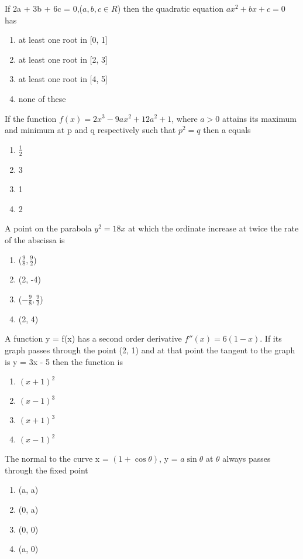\item If 2a + 3b + 6c = 0,($a, b, c \in R$) then the quadratic equation $ax^2 + bx + c = 0$ has 
\begin{enumerate}
\item at least one root in [0, 1]
\item at least one root in [2, 3]
\item at least one root in [4, 5]
\item none of these
\end{enumerate}

\item If the function $f(x) = 2x^3 - 9ax^2 + 12a^2 + 1$, where $a > 0$ attains its maximum and  minimum at p and q respectively such that $p^2 = q$ then a equals
\begin{enumerate}
\item $\frac{1}{2}$
\item 3
\item 1
\item 2
\end{enumerate}

\item A point on the parabola $y^2 = 18x$ at which the ordinate increase at twice the rate of the abscissa is \begin{enumerate}
\item ($\frac{9}{8}, \frac{9}{2}$)
\item (2, -4)
\item ($-\frac{9}{8}, \frac{9}{2}$)
\item (2, 4)
\end{enumerate}
    
\item A function y = f(x) has a second order derivative $f''(x) = 6(1 - x)$. If its graph passes through the point (2, 1) and at that point the tangent to the graph is y = 3x - 5 then the function is
\begin{enumerate}
\item $(x + 1)^2$
\item $(x - 1)^3$
\item $(x + 1)^3$
\item $(x - 1)^2$
\end{enumerate}

\item The normal to the curve x = $(1 + \cos \theta)$, y = $a\sin \theta$ at $\theta$ always passes through the fixed point 
\begin{enumerate}
\item (a, a)
\item (0, a)
\item (0, 0)
\item (a, 0)
\end{enumerate}

